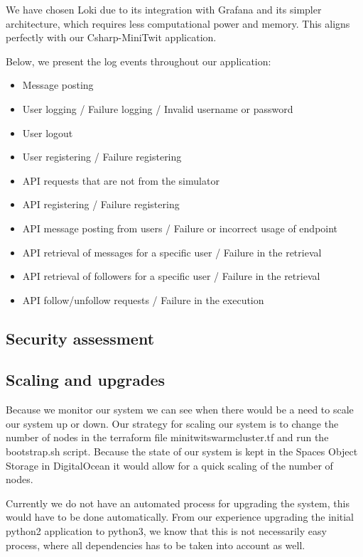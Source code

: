 We have chosen Loki due to its integration with Grafana and its simpler architecture, which requires less computational power and memory. This aligns perfectly with our Csharp-MiniTwit application. \newline

Below, we present the log events throughout our application:
\begin{itemize}
    \item Message posting
    \item User logging / Failure logging / Invalid username or password
    \item User logout
    \item User registering / Failure registering
    \item API requests that are not from the simulator
    \item API registering / Failure registering
    \item API message posting from users / Failure or incorrect usage of endpoint
    \item API retrieval of messages for a specific user / Failure in the retrieval
    \item API retrieval of followers for a specific user / Failure in the retrieval
    \item API follow/unfollow requests / Failure in the execution
    
\end{itemize}


\subsection{Security assessment}


\subsection{Scaling and upgrades}
Because we monitor our system we can see when there would be a need to scale our system up or down. Our strategy for scaling our system is to change the number of nodes in the terraform file minitwit\textunderscore swarm\textunderscore cluster.tf and run the bootstrap.sh script. Because the state of our system is kept in the Spaces Object Storage in DigitalOcean it would allow for a quick scaling of the number of nodes. 

Currently we do not have an automated process for upgrading the system, this would have to be done automatically. From our experience upgrading the initial python2 application to python3, we know that this is not necessarily easy process, where all dependencies has to be taken into account as well. 

